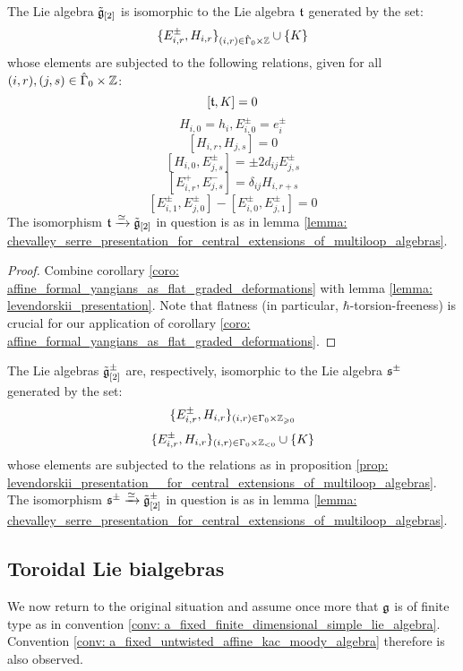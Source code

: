         \begin{proposition} \label{prop: levendorskii_presentation__for_central_extensions_of_multiloop_algebras}
            The Lie algebra $\tilde{\mathfrak{g}}_{[2]}$ is isomorphic to the Lie algebra $\mathfrak{t}$ generated by the set:
                $$\{ E_{i, r}^{\pm}, H_{i, r} \}_{(i, r) \in \hat{\Gamma}_0 \x \Z} \cup \{ K \}$$
            whose elements are subjected to the following relations, given for all $(i, r), (j, s) \in \hat{\Gamma}_0 \x \Z$:
                $$[\mathfrak{t}, K] = 0$$
                $$H_{i, 0} = h_i, E_{i, 0}^{\pm} = e_i^{\pm}$$
                $$[ H_{i, r}, H_{j, s} ] = 0$$
                $$[ H_{i, 0}, E_{j, s}^{\pm} ] = \pm 2 d_{ij} E_{j, s}^{\pm}$$
                $$[ E_{i, r}^+, E_{j, s}^- ] = \delta_{ij} H_{i, r + s}$$
                $$[ E_{i, 1}^{\pm}, E_{j, 0}^{\pm} ] - [ E_{i, 0}^{\pm}, E_{j, 1}^{\pm} ] = 0$$
            The isomorphism $\mathfrak{t} \xrightarrow[]{\simeq} \tilde{\mathfrak{g}}_{[2]}$ in question is as in lemma \ref{lemma: chevalley_serre_presentation_for_central_extensions_of_multiloop_algebras}.
        \end{proposition}
            \begin{proof}
                Combine corollary \ref{coro: affine_formal_yangians_as_flat_graded_deformations} with lemma \ref{lemma: levendorskii_presentation}. Note that flatness (in particular, $\hbar$-torsion-freeness) is crucial for our application of corollary \ref{coro: affine_formal_yangians_as_flat_graded_deformations}.
            \end{proof}
        \begin{corollary} \label{coro: levendorskii_presentation__for_central_extensions_of_multiloop_algebras}
            The Lie algebras $\tilde{\mathfrak{g}}_{[2]}^{\pm}$ are, respectively, isomorphic to the Lie algebra $\mathfrak{s}^{\pm}$ generated by the set:
                $$\{ E_{i, r}^{\pm}, H_{i, r} \}_{(i, r) \in \Gamma_0 \x \Z_{\geq 0}}$$
                $$\{ E_{i, r}^{\pm}, H_{i, r} \}_{(i, r) \in \Gamma_0 \x \Z_{< 0}} \cup \{K\}$$
            whose elements are subjected to the relations as in proposition \ref{prop: levendorskii_presentation__for_central_extensions_of_multiloop_algebras}. The isomorphism $\mathfrak{s}^{\pm} \xrightarrow[]{\simeq} \tilde{\mathfrak{g}}_{[2]}^{\pm}$ in question is as in lemma \ref{lemma: chevalley_serre_presentation_for_central_extensions_of_multiloop_algebras}.
        \end{corollary}

    \subsection{Toroidal Lie bialgebras}
        \begin{convention}
            We now return to the original situation and assume once more that $\mathfrak{g}$ is of finite type as in convention \ref{conv: a_fixed_finite_dimensional_simple_lie_algebra}. Convention \ref{conv: a_fixed_untwisted_affine_kac_moody_algebra} therefore is also observed. 
        \end{convention}
    
